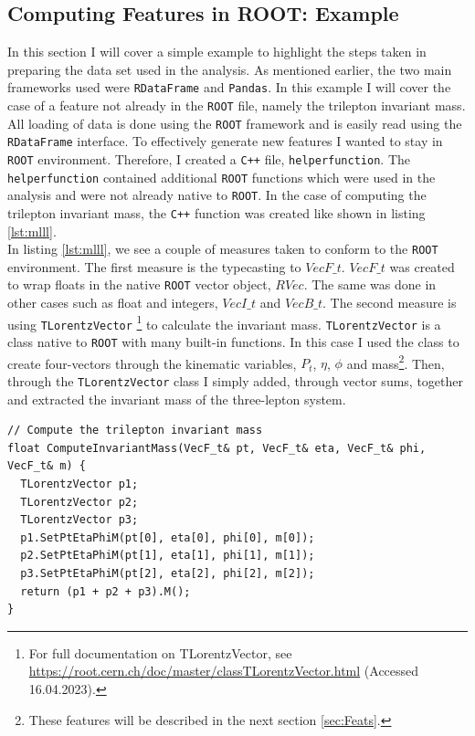 \subsection{Computing Features in ROOT: Example}
In this section I will cover a simple example to highlight the steps taken in preparing the data set 
used in the analysis. As mentioned earlier, the two main frameworks used were \verb!RDataFrame! and \verb!Pandas!. 
In this example I will cover the case of a feature not already in the \verb!ROOT! file, namely the trilepton
invariant mass. All loading of data is done using the \verb!ROOT! framework and is easily read using the
\verb!RDataFrame! interface. To effectively generate new features I wanted to stay in \verb!ROOT! environment. Therefore,
I created a \verb!C++! file, \texttt{helperfunction}. The \texttt{helperfunction} contained additional 
\verb!ROOT! functions which were used in the analysis and were not already native to \verb!ROOT!. In the case 
of computing the trilepton invariant mass, the \verb!C++! function was created like shown in listing 
\ref{lst:mlll}.
\\
In listing \ref{lst:mlll}, we see a couple of measures taken to conform to the \verb!ROOT! environment. The first measure is 
the typecasting to $VecF\_t$. $VecF\_t$ was created to wrap floats in the native \verb!ROOT! vector object, $RVec$. 
The same was done in other cases such as float and integers, $VecI\_t$ and $VecB\_t$. The second measure
is using \verb!TLorentzVector! \footnote{For full documentation on TLorentzVector, see \url{https://root.cern.ch/doc/master/classTLorentzVector.html} (Accessed 16.04.2023).} 
to calculate the invariant mass. \verb!TLorentzVector! is a class native to \verb!ROOT! with many built-in functions. In 
this case I used the class to create four-vectors through the kinematic variables, $P_t$, $\eta$, $\phi$ and mass\footnote{These features
will be described in the next section \ref{sec:Feats}.}. Then, through the \verb!TLorentzVector! class I simply added, through vector sums, 
together and extracted the invariant mass of the three-lepton system. 
\lstset{style=Cpp}
\begin{lstlisting}[caption={$C{++}$-function which implementes the calculation of the trilepton invariant mass.},captionpos=b, label={lst:mlll}]
// Compute the trilepton invariant mass 
float ComputeInvariantMass(VecF_t& pt, VecF_t& eta, VecF_t& phi, VecF_t& m) {
  TLorentzVector p1;
  TLorentzVector p2;
  TLorentzVector p3;
  p1.SetPtEtaPhiM(pt[0], eta[0], phi[0], m[0]);
  p2.SetPtEtaPhiM(pt[1], eta[1], phi[1], m[1]);
  p3.SetPtEtaPhiM(pt[2], eta[2], phi[2], m[2]);
  return (p1 + p2 + p3).M();
}
\end{lstlisting}
